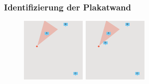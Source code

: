 \documentclass{beamer}
\begin{document}
\begin{frame}
    \frametitle{Identifizierung der Plakatwand}
    \begin{figure}
        \centering
        \begin{minipage}{.5\textwidth}
            \centering
            \includegraphics[width=.9\linewidth]{images/billboard_identification_1}
        \end{minipage}%
        \begin{minipage}{.5\textwidth}
            \centering
            \includegraphics[width=.9\linewidth]{images/billboard_identification_2}
        \end{minipage}
    \end{figure}  
\end{frame}
\end{document}
